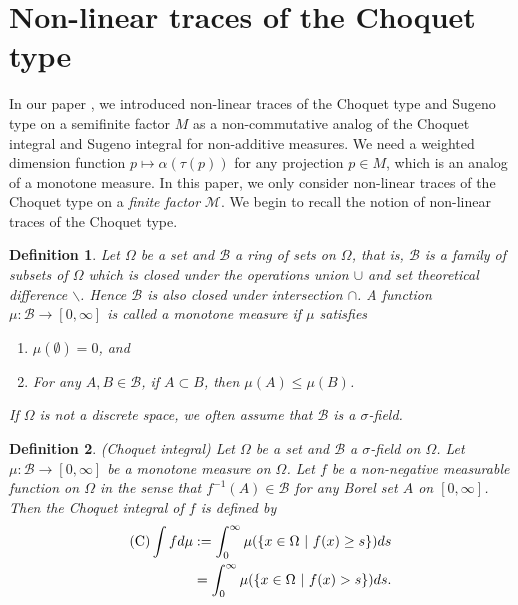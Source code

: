 \documentclass[a4paper,12pt]{amsart}
\newtheorem{definition}{Definition}[section]
\newcommand{\M}{\mathcal{M}}
\begin{document}
\section{Non-linear traces of the Choquet type}
In our paper \cite{nagisawatatani4}, we introduced non-linear traces of the Choquet type and Sugeno type on a semifinite factor $M$ as a non-commutative analog of the Choquet integral and Sugeno integral for non-additive measures. 
We need a weighted dimension function $p \mapsto \alpha(\tau(p))$ for any projection $p \in M$, which is an analog of 
a monotone measure.  In this paper,  we only consider non-linear traces of the Choquet type on a {\it finite factor} $\M$.  
We begin to recall the notion of non-linear traces of the Choquet type.  
\begin{definition} \rm
Let $\Omega$ be a set and ${\mathcal B}$ a ring of sets on $\Omega$, that is, 
${\mathcal B}$ is a family of subsets of $\Omega$ which is closed under the operations 
union $\cup$ and set theoretical difference $\backslash$. Hence  ${\mathcal B}$ is also 
closed under intersection $\cap$. 
A function $\mu: {\mathcal B} \rightarrow [0, \infty]$ is  called a 
{\it monotone measure} if $\mu$ satisfies 
\begin{enumerate}
\item[$(1)$]  $\mu(\emptyset) = 0$, and 
\item[$(2)$] For any $A,B \in {\mathcal B}$, if $A \subset B$, 
then $\mu(A) \leq \mu(B)$. 
\end{enumerate}
If $\Omega$ is not a discrete space, we often assume that ${\mathcal B}$ is a $\sigma$-field.  


\end{definition}

\begin{definition} \rm (Choquet integral)
Let $\Omega$ be a set and ${\mathcal B}$ a $\sigma$-field on $\Omega$.  
Let  $\mu: {\mathcal B} \rightarrow [0, \infty]$ be a monotone measure on $\Omega$. 
Let $f$ be a non-negative measurable function on $\Omega$ in the sense that $f^{-1}(A) \in {\mathcal B}$ 
for any Borel set $A$ on $[0, \infty]$. Then the Choquet integral of $f$ is defined by 
\begin{align*}
{\rm (C)} \int f d\mu & := \int_0^{\infty} \mu ( \{ x \in \Omega \ | \ f(x) \geq s \}) ds \\
& =  \int_0^{\infty} \mu ( \{ x \in \Omega \ | \ f(x) > s \}) ds.  
\end{align*}
\end{definition}
\end{document}
